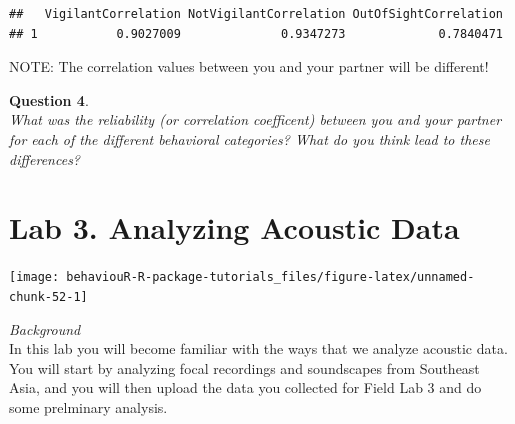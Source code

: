 \documentclass[]{book}
\newenvironment{Shaded}{\begin{snugshade}}{\end{snugshade}}
\newcommand{\CommentTok}[1]{\textcolor[rgb]{0.56,0.35,0.01}{\textit{#1}}}
\newcommand{\KeywordTok}[1]{\textcolor[rgb]{0.13,0.29,0.53}{\textbf{#1}}}
\newcommand{\NormalTok}[1]{#1}
\newcommand{\OperatorTok}[1]{\textcolor[rgb]{0.81,0.36,0.00}{\textbf{#1}}}
\newcommand{\StringTok}[1]{\textcolor[rgb]{0.31,0.60,0.02}{#1}}
\begin{document}
\begin{Shaded}
\end{Shaded}

\begin{verbatim}
##   VigilantCorrelation NotVigilantCorrelation OutOfSightCorrelation
## 1           0.9027009              0.9347273             0.7840471
\end{verbatim}

NOTE: The correlation values between you and your partner will be different!

\textbf{Question 4}.\\
\emph{What was the reliability (or correlation coefficent) between you and your partner for each of the different behavioral categories? What do you think lead to these differences? }

\hypertarget{lab-3.-analyzing-acoustic-data}{%
\chapter{Lab 3. Analyzing Acoustic Data}\label{lab-3.-analyzing-acoustic-data}}

\begin{center}\texttt{[image: behaviouR-R-package-tutorials\_files/figure-latex/unnamed-chunk-52-1]} \end{center}

\emph{Background}\\
In this lab you will become familiar with the ways that we analyze acoustic data. You will start by analyzing focal recordings and soundscapes from Southeast Asia, and you will then upload the data you collected for Field Lab 3 and do some prelminary analysis.
\end{document}

